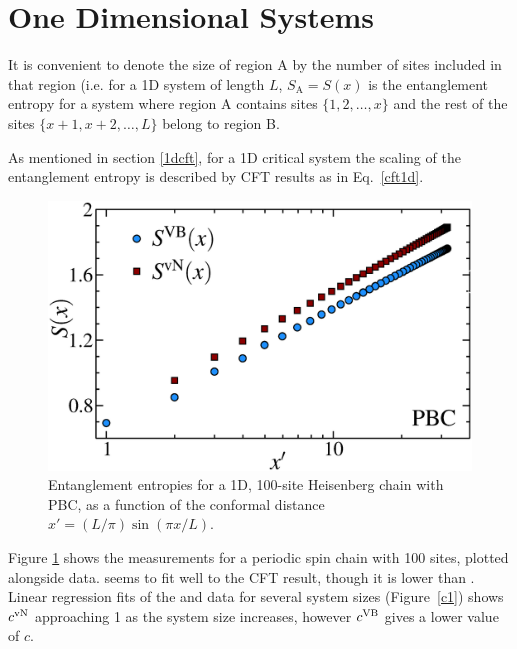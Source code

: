 \section{One Dimensional Systems}


It is convenient to denote the size of region A by the number of sites included in that region 
(i.e. for a 1D system of length $L$, $S_{\text{A}} = S(x)$ is the entanglement entropy for a system where region A contains sites $\{1,2,\dots,x\}$ and the rest of the sites $\{x+1,x+2,\dots,L\}$
belong to region B.

As mentioned in section \ref{1dcft}, for a 1D critical system the scaling of the entanglement entropy is described by CFT results as in Eq.~\eqref{cft1d}. 

\begin{figure} {
\includegraphics[width=5.5in]{./figures/paper1/figure1/thesis_pbc.eps} 
\centering
\caption[1D PBC Results for \vb with \vn]{
Entanglement entropies for a 1D, 100-site Heisenberg chain with PBC, as a function of the conformal distance $x'  = (L/\pi)\sin (\pi x/L)$.
\label{1dPBC}}
} 
\end{figure}

Figure \ref{1dPBC} shows the \vb measurements for a periodic spin chain with 100 sites, plotted alongside \vn data.  \vb seems to fit well to the CFT result, though it is lower than \vn.
Linear regression fits of the \vb and \vn data for several system sizes (Figure~\ref{c1}) shows $c^{\rm vN}$ approaching 1 as the system size increases, however $c^{\rm VB}$ gives a lower value of $c$.



